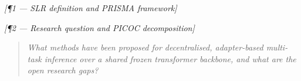 
\bigskip\noindent\textit{[¶1 — SLR definition and PRISMA framework]}


\bigskip\noindent\textit{[¶2 — Research question and PICOC decomposition]}

\begin{quote}
  \textit{What methods have been proposed for decentralised, adapter-based
  multi-task inference over a shared frozen transformer backbone, and what
  are the open research gaps?}
\end{quote}



